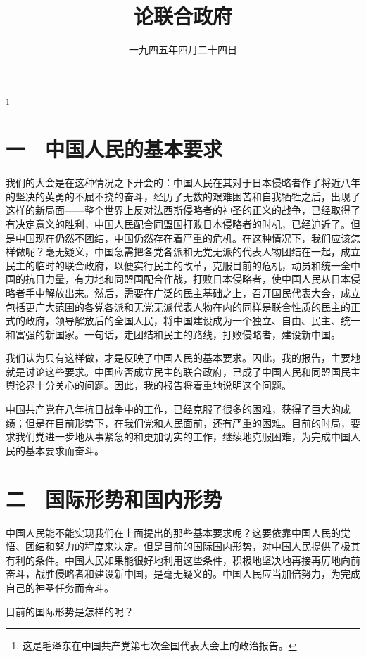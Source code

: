 
\title{论联合政府}
\date{一九四五年四月二十四日}
\thanks{这是毛泽东在中国共产党第七次全国代表大会上的政治报告。}
\maketitle


\section{一　中国人民的基本要求}

我们的大会是在这种情况之下开会的：中国人民在其对于日本侵略者作了将近八年的坚决的英勇的不屈不挠的奋斗，经历了无数的艰难困苦和自我牺牲之后，出现了这样的新局面——整个世界上反对法西斯侵略者的神圣的正义的战争，已经取得了有决定意义的胜利，中国人民配合同盟国打败日本侵略者的时机，已经迫近了。但是中国现在仍然不团结，中国仍然存在着严重的危机。在这种情况下，我们应该怎样做呢？毫无疑义，中国急需把各党各派和无党无派的代表人物团结在一起，成立民主的临时的联合政府，以便实行民主的改革，克服目前的危机，动员和统一全中国的抗日力量，有力地和同盟国配合作战，打败日本侵略者，使中国人民从日本侵略者手中解放出来。然后，需要在广泛的民主基础之上，召开国民代表大会，成立包括更广大范围的各党各派和无党无派代表人物在内的同样是联合性质的民主的正式的政府，领导解放后的全国人民，将中国建设成为一个独立、自由、民主、统一和富强的新国家。一句话，走团结和民主的路线，打败侵略者，建设新中国。

我们认为只有这样做，才是反映了中国人民的基本要求。因此，我的报告，主要地就是讨论这些要求。中国应否成立民主的联合政府，已成了中国人民和同盟国民主舆论界十分关心的问题。因此，我的报告将着重地说明这个问题。

中国共产党在八年抗日战争中的工作，已经克服了很多的困难，获得了巨大的成绩；但是在目前形势下，在我们党和人民面前，还有严重的困难。目前的时局，要求我们党进一步地从事紧急的和更加切实的工作，继续地克服困难，为完成中国人民的基本要求而奋斗。

\section{二　国际形势和国内形势}

中国人民能不能实现我们在上面提出的那些基本要求呢？这要依靠中国人民的觉悟、团结和努力的程度来决定。但是目前的国际国内形势，对中国人民提供了极其有利的条件。中国人民如果能很好地利用这些条件，积极地坚决地再接再厉地向前奋斗，战胜侵略者和建设新中国，是毫无疑义的。中国人民应当加倍努力，为完成自己的神圣任务而奋斗。

目前的国际形势是怎样的呢？

